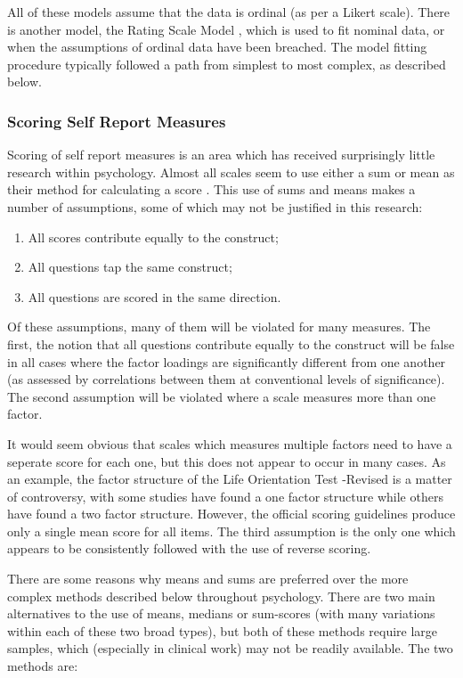 All of these models assume that the data is ordinal (as per a Likert scale). There is another model, the Rating Scale Model \cite{bock1997nominal}, which is used to fit nominal data, or when the assumptions of ordinal data have been breached. The model fitting procedure typically followed a path from simplest to most complex, as described below.

\subsubsection{Scoring Self Report Measures}

Scoring of self report measures is an area which has received surprisingly little research within psychology. Almost all scales seem to use either a sum or mean as their method for calculating a score \cite{borsboom2006attack}. This use of sums and means makes a number of assumptions, some of which may not be justified in this research:

\begin{enumerate}
\item All scores contribute equally to the construct;
\item All questions tap the same construct;
\item All questions are scored in the same direction.
\end{enumerate}

Of these assumptions, many of them will be violated for many measures. The first, the notion that all questions contribute equally to the construct will be false in all cases where the factor loadings are significantly different from one another (as assessed by correlations between them at conventional levels of significance). The second assumption will be violated where a scale measures more than one factor. 

It would seem obvious that scales which measures multiple factors need to have a seperate score for each one, but this does not appear to occur in many cases. As an example, the factor structure of the Life Orientation Test -Revised is a matter of controversy, with some studies have found a one factor structure while others have found a two factor structure. However, the official scoring guidelines produce only a single mean score for all items.  The third assumption is the only one which appears to be consistently followed with the use of reverse scoring.

There are some reasons why means and sums are preferred over the more complex methods described below throughout psychology. There are two main alternatives to the use of means, medians or sum-scores (with many variations within each of these two broad types), but both of these methods require large samples, which (especially in clinical work) may not be readily available. 
The two methods are:


